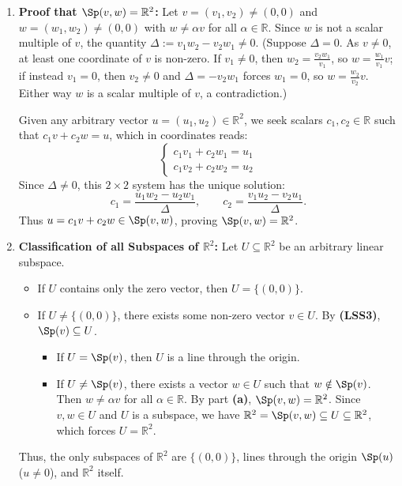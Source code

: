 \begin{exercisesolution}
\label{sol:subspaces_two_dimensions}
\begin{enumerate}[label=\textbf{(\alph*)}]
    \item \textbf{Proof that $\Sp(v, w) = \mathbb{R}^2$:}
    Let $v = (v_1, v_2) \ne (0, 0)$ and $w = (w_1, w_2) \ne (0, 0)$ with $w \ne \alpha v$ for all $\alpha \in \mathbb{R}$.
    Since $w$ is not a scalar multiple of $v$, the quantity $\Delta := v_1 w_2 - v_2 w_1 \ne 0$. (Suppose $\Delta = 0$. As $v \ne 0$, at least one coordinate of $v$ is non-zero. If $v_1 \ne 0$, then $w_2 = \frac{v_2 w_1}{v_1}$, so $w = \frac{w_1}{v_1} v$; if instead $v_1 = 0$, then $v_2 \ne 0$ and $\Delta = -v_2 w_1$ forces $w_1 = 0$, so $w = \frac{w_2}{v_2} v$. Either way $w$ is a scalar multiple of $v$, a contradiction.)
    
    Given any arbitrary vector $u = (u_1, u_2) \in \mathbb{R}^2$, we seek scalars $c_1, c_2 \in \mathbb{R}$ such that $c_1 v + c_2 w = u$, which in coordinates reads:
    \[
    \begin{cases}
    c_1 v_1 + c_2 w_1 = u_1 \\
    c_1 v_2 + c_2 w_2 = u_2
    \end{cases}
    \]
    Since $\Delta \ne 0$, this $2 \times 2$ system has the unique solution:
    \[
    c_1 = \frac{u_1 w_2 - u_2 w_1}{\Delta}, \qquad c_2 = \frac{v_1 u_2 - v_2 u_1}{\Delta}.
    \]
    Thus $u = c_1 v + c_2 w \in \Sp(v, w)$, proving $\Sp(v, w) = \mathbb{R}^2$.

    \item \textbf{Classification of all Subspaces of $\mathbb{R}^2$:}
    Let $U \subseteq \mathbb{R}^2$ be an arbitrary linear subspace.
    \begin{itemize}
        \item If $U$ contains only the zero vector, then $U = \{(0, 0)\}$.
        \item If $U \ne \{(0, 0)\}$, there exists some non-zero vector $v \in U$. By \textbf{(LSS3)}, $\Sp(v) \subseteq U$.
        \begin{itemize}
            \item If $U = \Sp(v)$, then $U$ is a line through the origin.
            \item If $U \ne \Sp(v)$, there exists a vector $w \in U$ such that $w \notin \Sp(v)$. Then $w \ne \alpha v$ for all $\alpha \in \mathbb{R}$. By part \textbf{(a)}, $\Sp(v, w) = \mathbb{R}^2$. Since $v, w \in U$ and $U$ is a subspace, we have $\mathbb{R}^2 = \Sp(v, w) \subseteq U \subseteq \mathbb{R}^2$, which forces $U = \mathbb{R}^2$.
        \end{itemize}
    \end{itemize}
    Thus, the only subspaces of $\mathbb{R}^2$ are $\{(0, 0)\}$, lines through the origin $\Sp(u)$ ($u \ne 0$), and $\mathbb{R}^2$ itself.
\end{enumerate}
\end{exercisesolution}

